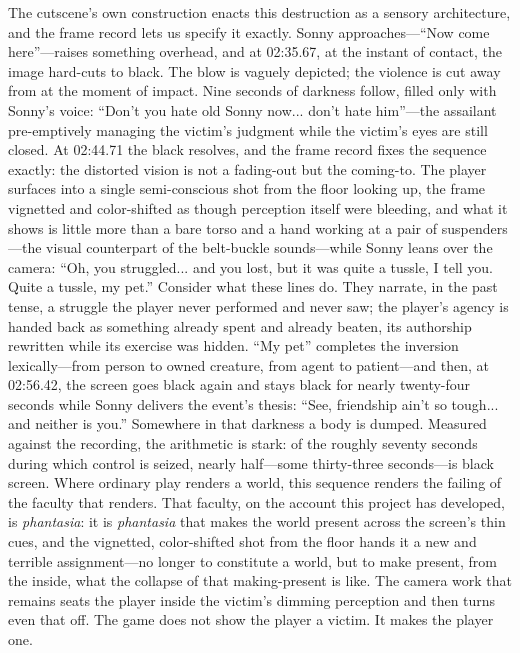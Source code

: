 The cutscene's own construction enacts this destruction as a sensory architecture, and the frame record lets us specify it exactly. Sonny approaches---``Now come here''---raises something overhead, and at 02:35.67, at the instant of contact, the image hard-cuts to black. The blow is vaguely depicted; the violence is cut away from at the moment of impact. Nine seconds of darkness follow, filled only with Sonny's voice: ``Don't you hate old Sonny now... don't hate him''---the assailant pre-emptively managing the victim's judgment while the victim's eyes are still closed. At 02:44.71 the black resolves, and the frame record fixes the sequence exactly: the distorted vision is not a fading-out but the coming-to. The player surfaces into a single semi-conscious shot from the floor looking up, the frame vignetted and color-shifted as though perception itself were bleeding, and what it shows is little more than a bare torso and a hand working at a pair of suspenders---the visual counterpart of the belt-buckle sounds---while Sonny leans over the camera: ``Oh, you struggled... and you lost, but it was quite a tussle, I tell you. Quite a tussle, my pet.'' Consider what these lines do. They narrate, in the past tense, a struggle the player never performed and never saw; the player's agency is handed back as something already spent and already beaten, its authorship rewritten while its exercise was hidden. ``My pet'' completes the inversion lexically---from person to owned creature, from agent to patient---and then, at 02:56.42, the screen goes black again and stays black for nearly twenty-four seconds while Sonny delivers the event's thesis: ``See, friendship ain't so tough... and neither is you.'' Somewhere in that darkness a body is dumped. Measured against the recording, the arithmetic is stark: of the roughly seventy seconds during which control is seized, nearly half---some thirty-three seconds---is black screen. Where ordinary play renders a world, this sequence renders the failing of the faculty that renders. That faculty, on the account this project has developed, is \textit{phantasia}: it is \textit{phantasia} that makes the world present across the screen's thin cues, and the vignetted, color-shifted shot from the floor hands it a new and terrible assignment---no longer to constitute a world, but to make present, from the inside, what the collapse of that making-present is like. The camera work that remains seats the player inside the victim's dimming perception and then turns even that off. The game does not show the player a victim. It makes the player one.

